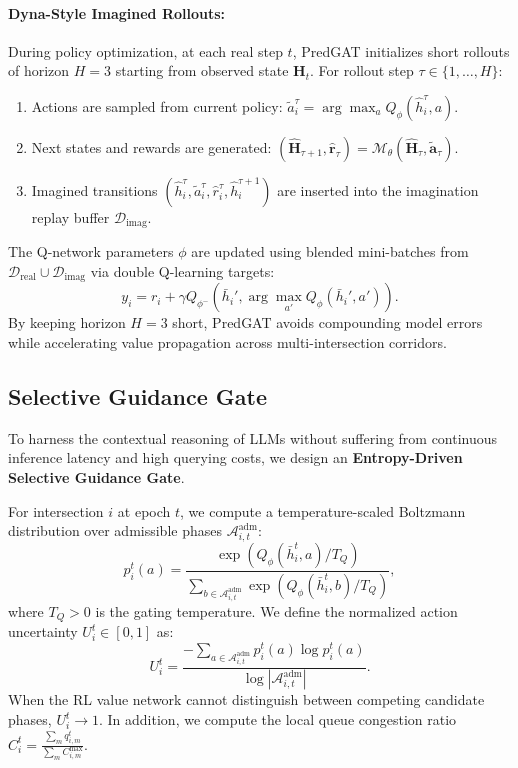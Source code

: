 \documentclass[11pt,a4paper]{article}
\begin{document}
\paragraph{Dyna-Style Imagined Rollouts:}
During policy optimization, at each real step $t$, PredGAT initializes short rollouts of horizon $H=3$ starting from observed state $\mathbf{H}_t$. For rollout step $\tau \in \{1, \dots, H\}$:
\begin{enumerate}
    \item Actions are sampled from current policy: $\widetilde{a}_i^\tau = \arg\max_{a} Q_\phi(\widehat{h}_i^\tau, a)$.
    \item Next states and rewards are generated: $(\widehat{\mathbf{H}}_{\tau+1}, \widehat{\mathbf{r}}_\tau) = \mathcal{M}_\theta(\widehat{\mathbf{H}}_\tau, \widetilde{\mathbf{a}}_\tau)$.
    \item Imagined transitions $(\widehat{h}_i^\tau, \widetilde{a}_i^\tau, \widehat{r}_i^\tau, \widehat{h}_i^{\tau+1})$ are inserted into the imagination replay buffer $\mathcal{D}_{\text{imag}}$.
\end{enumerate}
The Q-network parameters $\phi$ are updated using blended mini-batches from $\mathcal{D}_{\text{real}} \cup \mathcal{D}_{\text{imag}}$ via double Q-learning targets:
\begin{equation}
    y_i = r_i + \gamma Q_{\phi^-}\left( \bar{h}_i', \arg\max_{a'} Q_\phi(\bar{h}_i', a') \right).
\end{equation}
By keeping horizon $H=3$ short, PredGAT avoids compounding model errors while accelerating value propagation across multi-intersection corridors.

\subsection{Selective Guidance Gate}
\label{subsec:gate}
To harness the contextual reasoning of LLMs without suffering from continuous inference latency and high querying costs, we design an \textbf{Entropy-Driven Selective Guidance Gate}.

For intersection $i$ at epoch $t$, we compute a temperature-scaled Boltzmann distribution over admissible phases $\mathcal{A}_{i,t}^{\text{adm}}$:
\begin{equation}
    p_i^t(a) = \frac{\exp(Q_\phi(\bar{h}_i^t, a) / T_Q)}{\sum_{b \in \mathcal{A}_{i,t}^{\text{adm}}} \exp(Q_\phi(\bar{h}_i^t, b) / T_Q)},
\end{equation}
where $T_Q > 0$ is the gating temperature. We define the normalized action uncertainty $U_i^t \in [0, 1]$ as:
\begin{equation}
    U_i^t = \frac{-\sum_{a \in \mathcal{A}_{i,t}^{\text{adm}}} p_i^t(a) \log p_i^t(a)}{\log |\mathcal{A}_{i,t}^{\text{adm}}|}.
\end{equation}
When the RL value network cannot distinguish between competing candidate phases, $U_i^t \to 1$. In addition, we compute the local queue congestion ratio $C_i^t = \frac{\sum_{m} q_{i,m}^t}{\sum_{m} C_{i,m}^{\max}}$.
\end{document}
